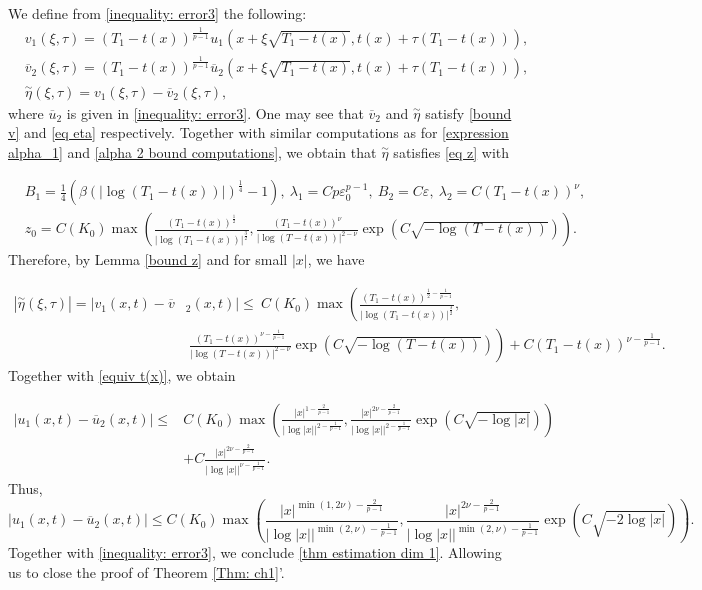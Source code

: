 \documentclass[11pt,a4paper]{article}
\newcommand{\1}{\mathbbm{1}}
\numberwithin{equation}{section}
\theoremstyle{remark}
\begin{document}
We define from \eqref{inequality: error3} the following:
\begin{equation*}
\begin{split}
&v_1(\xi,\tau)=(T_1-t(x))^{\frac{1}{p-1}}u_1(x+\xi\sqrt{T_1-t(x)},t(x)+\tau (T_1-t(x))),\\
&\overline{v}_2(\xi,\tau)=(T_1-t(x))^{\frac{1}{p-1}}\overline{u}_2(x+\xi\sqrt{T_1-t(x)},t(x)+\tau (T_1-t(x))),\\
&\overset{\sim}{\eta}(\xi,\tau)=v_1(\xi,\tau)-\overline{v}_2(\xi,\tau),
\end{split}
\end{equation*}
where $\overline{u}_2$ is given in \eqref{inequality: error3}. One may see that $\overline{v}_2$ and $\overset{\sim}{\eta}$ satisfy \eqref{bound v} and \eqref{eq eta} respectively. Together with similar computations as for \eqref{expression alpha_1} and \eqref{alpha 2 bound computations}, we obtain that $\overset{\sim}{\eta}$ satisfies \eqref{eq z} with 

\begin{equation*}
\begin{split}
&B_1=\frac{1}{4}\left(\beta (|\log(T_1-t(x))|)^{\frac{1}{4}}-1\right),\ \lambda_1=Cp\varepsilon_0^{p-1},\ B_2=C\varepsilon,\ \lambda_2=C(T_1-t(x))^{\nu},\\
&z_0=C(K_0)\max\left(\frac{(T_1-t(x))^{\frac{1}{2}}}{|\log(T_1-t(x))|^{\frac{3}{2}}}, \frac{(T_1-t(x))^{\nu}}{|\log(T-t(x))|^{2-\nu}}\exp\left(C\sqrt{-\log(T-t(x))}\right)\right).
\end{split}
\end{equation*}
Therefore, by Lemma \ref{bound z} and for small $|x|$, we have 

\begin{equation*}
\begin{split}
|\overset{\sim}{\eta}(\xi,\tau)|=|v_1(x,t)-\overline{v}&_2(x,t)|\leq \ C(K_0)\max\left(\frac{(T_1-t(x))^{\frac{1}{2}-\frac{1}{p-1}}}{|\log(T_1-t(x))|^{\frac{3}{2}}},\right.\\
&\ \left. \frac{(T_1-t(x))^{\nu-\frac{1}{p-1}}}{|\log(T-t(x))|^{2-\nu}}\exp\left(C\sqrt{-\log(T-t(x))}\right)\right)+C(T_1-t(x))^{\nu-\frac{1}{p-1}}.
\end{split}
\end{equation*}
Together with \eqref{equiv t(x)}, we obtain

\begin{equation}
\begin{split}
|u_1(x,t)-\overline{u}_2(x,t)|\leq & C(K_0)\max\left(\frac{|x|^{1-\frac{2}{p-1}}}{|\log |x||^{2-\frac{1}{p-1}}}, \frac{|x|^{2\nu-\frac{2}{p-1}}}{|\log |x||^{2-\frac{1}{p-1}}}\exp\left(C\sqrt{-\log |x|}\right)\right)\\
&+C\frac{|x|^{2\nu-\frac{2}{p-1}}}{|\log|x||^{\nu-\frac{1}{p-1}}}.
\end{split}
\end{equation}
Thus,
$$|u_1(x,t)-\overline{u}_2(x,t)|\leq C(K_0)\max\left(\frac{|x|^{\min(1,2\nu)-\frac{2}{p-1}}}{|\log |x||^{\min(2,\nu)-\frac{1}{p-1}}}, \frac{|x|^{2\nu-\frac{2}{p-1}}}{|\log |x||^{\min(2,\nu)-\frac{1}{p-1}}}\exp\left(C\sqrt{-2\log |x|}\right)\right).$$
Together with \eqref{inequality: error3}, we conclude \eqref{thm estimation dim 1}. Allowing us to close the proof of Theorem \ref{Thm: ch1}'.
\end{document}
